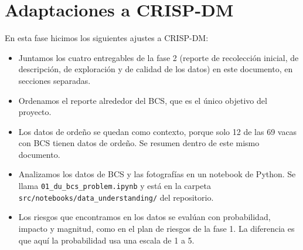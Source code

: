 \section*{Adaptaciones a CRISP-DM}

En esta fase hicimos los siguientes ajustes a CRISP-DM:

\begin{itemize}
  \item Juntamos los cuatro entregables de la fase 2 (reporte de recolección inicial, de descripción, de exploración y de calidad de los datos) en este documento, en secciones separadas.
  \item Ordenamos el reporte alrededor del BCS, que es el único objetivo del proyecto.
  \item Los datos de ordeño se quedan como contexto, porque solo 12 de las 69 vacas con BCS tienen datos de ordeño. Se resumen dentro de este mismo documento.
  \item Analizamos los datos de BCS y las fotografías en un notebook de Python. Se llama \nolinkurl{01_du_bcs_problem.ipynb} y está en la carpeta \nolinkurl{src/notebooks/data_understanding/} del repositorio.
  \item Los riesgos que encontramos en los datos se evalúan con probabilidad, impacto y magnitud, como en el plan de riesgos de la fase 1. La diferencia es que aquí la probabilidad usa una escala de 1 a 5.
\end{itemize}
